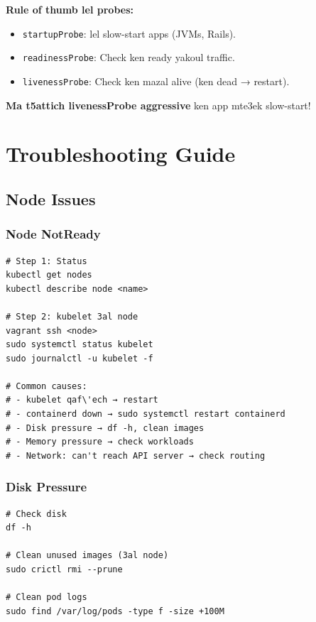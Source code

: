 \documentclass[11pt,a4paper]{book}
\begin{document}
\begin{tipbox}
\textbf{Rule of thumb lel probes:}
\begin{itemize}
  \item \texttt{startupProbe}: lel slow-start apps (JVMs, Rails).
  \item \texttt{readinessProbe}: Check ken ready yakoul traffic.
  \item \texttt{livenessProbe}: Check ken mazal alive (ken dead → restart).
\end{itemize}
\textbf{Ma t5attich livenessProbe aggressive} ken app mte3ek slow-start!
\end{tipbox}

\cleardoublepage

\chapter{Troubleshooting Guide}

\section{Node Issues}

\subsection{Node NotReady}

\begin{lstlisting}
# Step 1: Status
kubectl get nodes
kubectl describe node <name>

# Step 2: kubelet 3al node
vagrant ssh <node>
sudo systemctl status kubelet
sudo journalctl -u kubelet -f

# Common causes:
# - kubelet qaf\'ech → restart
# - containerd down → sudo systemctl restart containerd
# - Disk pressure → df -h, clean images
# - Memory pressure → check workloads
# - Network: can't reach API server → check routing
\end{lstlisting}

\subsection{Disk Pressure}

\begin{lstlisting}
# Check disk
df -h

# Clean unused images (3al node)
sudo crictl rmi --prune

# Clean pod logs
sudo find /var/log/pods -type f -size +100M
\end{lstlisting}
\end{document}
